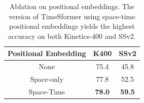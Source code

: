 \documentclass{article}
\newcommand{\LT}[1]{\textcolor{blue}{{\bf LT:} #1}}
\begin{document}





 
 \begin{table}
\centering
{\scriptsize
 \begin{tabular}{c c c }
 \hline
 {Positional Embedding} & {K400} & {SSv2} \\ 
 \hline
None & 75.4  & 45.8 \\
Space-only & 77.8  & 52.5 \\
Space-Time & \bf 78.0 & \bf 59.5\\
 \hline
 \end{tabular}
 }
  \vspace{-0.1cm}
\caption{Ablation on positional embeddings. The version of TimeSformer using space-time positional embeddings yields the highest accuracy on both Kinetics-400 and SSv2.\vspace{-0.3cm}}
\label{pos_results_table}
 \end{table}
 



%
%
\end{document}
